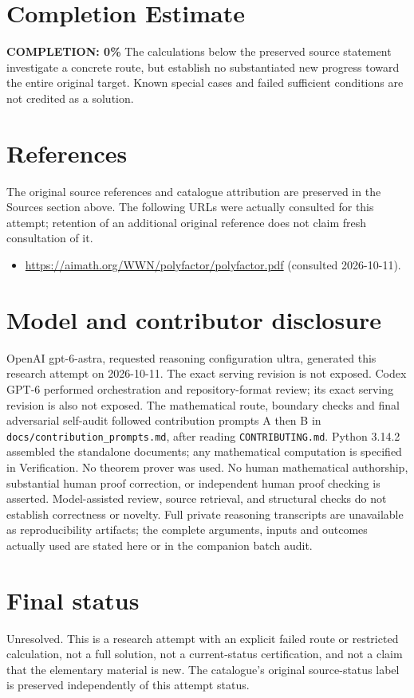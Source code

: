 \documentclass[11pt]{article}
\begin{document}
\section{Completion Estimate}
\noindent\textbf{COMPLETION: 0\%}
The calculations below the preserved source statement investigate a concrete route,
but establish no substantiated new progress toward the entire original target.
Known special cases and failed sufficient conditions are not credited as a solution.
\section{References}
The original source references and catalogue attribution are preserved in the
Sources section above. The following URLs were actually consulted for this attempt;
retention of an additional original reference does not claim fresh consultation of it.
\begin{itemize}
\item \url{https://aimath.org/WWN/polyfactor/polyfactor.pdf} (consulted 2026-10-11). 
\end{itemize}
\section{Model and contributor disclosure}
OpenAI gpt-6-astra, requested reasoning configuration ultra, generated this research
attempt on 2026-10-11. The exact serving revision is not exposed. Codex GPT-6
performed orchestration and repository-format review; its exact serving revision
is also not exposed. The mathematical route, boundary checks and final adversarial
self-audit followed contribution prompts A then B in
\texttt{docs/contribution\_prompts.md}, after reading \texttt{CONTRIBUTING.md}.
Python 3.14.2 assembled the standalone documents; any mathematical computation is
specified in Verification. No theorem prover was used. No human mathematical
authorship, substantial human proof correction, or independent human proof checking
is asserted. Model-assisted review, source retrieval, and structural checks do not
establish correctness or novelty. Full private reasoning transcripts are unavailable
as reproducibility artifacts; the complete arguments, inputs and outcomes actually
used are stated here or in the companion batch audit.
\section{Final status}
Unresolved. This is a research attempt with an explicit failed route or restricted
calculation, not a full solution, not a current-status certification, and not a claim
that the elementary material is new. The catalogue's original source-status label
is preserved independently of this attempt status.
\end{document}
